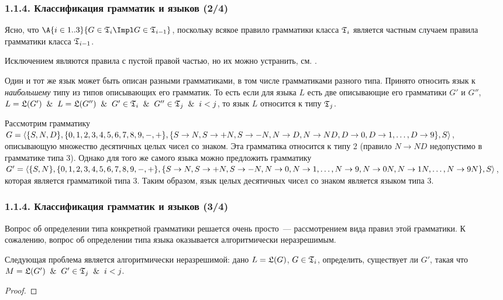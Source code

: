 \begin{frame}
\frametitle{1.1.4. Классификация грамматик и языков (2/4)}
Ясно, что $\A{i\in 1..3}{G\in \frak{T}_i\Impl G\in \frak{T}_{i-1}}$, поскольку всякое правило
грамматики класса $\frak{T}_i$ 
является частным случаем 
правила грамматики класса $\frak{T}_{i-1}$.

\begin{remark}
Исключением являются правила с пустой правой частью,
но их можно устранить, см. .
\end{remark}
\medskip
Один и тот же язык может быть описан разными грамматиками, в том
числе грамматиками разного типа. Принято относить язык к
{\em наибольшему} типу из типов описывающих его грамматик. То есть если
для языка $L$ есть две описывающие его грамматики $G'$ и $G''$,
$L=\frak{L}(G')\And L=\frak{L}(G'')\And G'\in \frak{T}_i\And G''\in \frak{T}_j\And i<j$, то
язык $L$ относится к типу $\frak{T}_j$.
\begin{example}
Рассмотрим грамматику
$G=\langle\{S,N,D\},\{0,1,2,3,4,5,6,7,8,9,-,+\},
\linebreak
\{S\rightarrow
N, S\rightarrow
+N, S\rightarrow
-N, N\rightarrow D, N\rightarrow ND, D\rightarrow 0, D\rightarrow 1,\ldots,D\rightarrow 9 \}, S\rangle$, описывающую множество десятичных целых чисел со знаком.
Эта грамматика относится к типу 2 (правило $N\rightarrow ND$
недопустимо в грамматике типа 3). Однако для того же самого языка
можно предложить грамматику
$G'=\langle\{S,N\},\{0,1,2,3,4,5,6,7,8,9,-,+\},
\linebreak
\{S\rightarrow N, 
S\rightarrow +N, 
S\rightarrow -N, 
N\rightarrow 0,
N\rightarrow 1,
\ldots,
N\rightarrow 9,
N\rightarrow 0N,
N\rightarrow 1N,
\ldots,\linebreak
N\rightarrow 9N
\}, S \rangle$,
которая является грамматикой типа 3. Таким образом, язык целых
десятичных чисел со знаком является языком типа 3.
\end{example}

\end{frame}

\begin{frame}
\frametitle{1.1.4. Классификация грамматик и языков (3/4)}

Вопрос об определении типа конкретной грамматики решается очень
просто~--- рассмотрением вида правил этой грамматики. К сожалению,
вопрос об определении типа языка оказывается алгоритмически
неразрешимым.
\begin{theorem} 
Следующая проблема является алгоритмически неразрешимой: дано
$L=\frak{L}(G)$, $G\in \frak{T}_i$, определить, существует ли $G'$,
такая что $M=\frak{L}(G') \And
G'\in \frak{T}_j\And i<j $.
\end{theorem}
\begin{proof} 
\end{proof}
\end{frame}

